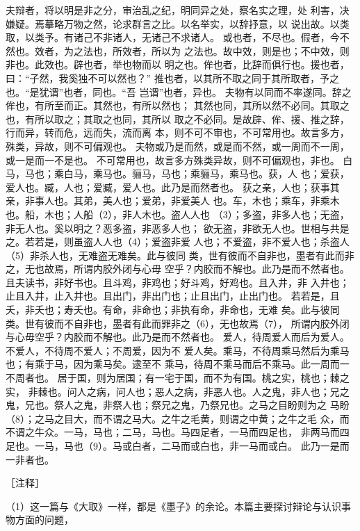 \documentclass[12pt,UTF8]{ctexbook}
\begin{document}
夫辩者，将以明是非之分，审治乱之纪，明同异之处，察名实之理，处 
利害，决嫌疑。焉摹略万物之然，论求群言之比。以名举实，以辞抒意，以 
说出故。以类取，以类予。有诸己不非诸人，无诸己不求诸人。 
或也者，不尽也。假者，今不然也。效者，为之法也，所效者，所以为 
之法也。故中效，则是也；不中效，则非也。此效也。辟也者，举也物而以 
明之也。侔也者，比辞而俱行也。援也者，曰：“子然，我奚独不可以然也？” 
推也者，以其所不取之同于其所取者，予之也。“是犹谓”也者，同也。“吾 
岂谓”也者，异也。 
夫物有以同而不率遂同。辞之侔也，有所至而正。其然也，有所以然也； 
其然也同，其所以然不必同。其取之也，有所以取之；其取之也同，其所以 
取之不必同。是故辟、侔、援、推之辞，行而异，转而危，远而失，流而离 
本，则不可不审也，不可常用也。故言多方，殊类，异故，则不可偏观也。 
夫物或乃是而然，或是而不然，或一周而不一周，或一是而一不是也。 
不可常用也，故言多方殊类异故，则不可偏观也，非也。 
白马，马也；乘白马，乘马也。骊马，马也；乘骊马，乘马也。获，人 
也；爱获，爱人也。臧，人也；爱臧，爱人也。此乃是而然者也。 
获之亲，人也；获事其亲，非事人也。其弟，美人也；爱弟，非爱美人 
也。车，木也；乘车，非乘木也。船，木也；人船（2），非人木也。盗人人也 
（3）；多盗，非多人也；无盗，非无人也。奚以明之？恶多盗，非恶多人也； 
欲无盗，非欲无人也。世相与共是之。若若是，则虽盗人人也（4）；爱盗非爱 
人也；不爱盗，非不爱人也；杀盗人（5）非杀人也，无难盗无难矣。此与彼同 
类，世有彼而不自非也，墨者有此而非之，无也故焉，所谓内胶外闭与心毋 
空乎？内胶而不解也。此乃是而不然者也。 
且夫读书，非好书也。且斗鸡，非鸡也；好斗鸡，好鸡也。且入井，非 
入井也；止且入井，止入井也。且出门，非出门也；止且出门，止出门也。 
若若是，且夭，非夭也；寿夭也。有命，非命也；非执有命，非命也，无难 
矣。此与彼同类。世有彼而不自非也，墨者有此而罪非之（6），无也故焉（7）， 
所谓内胶外闭与心毋空乎？内胶而不解也。此乃是而不然者也。 
爱人，待周爱人而后为爱人。不爱人，不待周不爱人；不周爱，因为不 
爱人矣。乘马，不待周乘马然后为乘马也；有乘于马，因为乘马矣。逮至不 
乘马，待周不乘马而后不乘马。此一周而一不周者也。 
居于国，则为居国；有一宅于国，而不为有国。桃之实，桃也；棘之实， 
非棘也。问人之病，问人也；恶人之病，非恶人也。人之鬼，非人也；兄之 
鬼，兄也。祭人之鬼，非祭人也；祭兄之鬼，乃祭兄也。之马之目盼则为之 
马盼（8）；之马之目大，而不谓之马大。之牛之毛黄，则谓之中黄；之牛之毛 
众，而不谓之牛众。一马，马也；二马，马也。马四足者，一马而四足也， 
非两马而四足也。一马，马也（9）。马或白者，二马而或白也，非一马而或白。 
此乃一是而一非者也。 


［注释］ 

（1）这一篇与《大取》一样，都是《墨子》的余论。本篇主要探讨辩论与认识事物方面的问题， 
\end{document}

